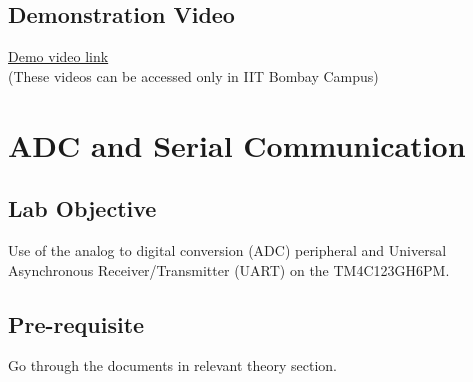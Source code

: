 \documentclass[a4paper,12pt,oneside]{book}
\begin{document}
\section{Demonstration Video}
\href{: http://10.129.139.139/videos/Lab3.html}{Demo video link}\\
(These videos can be accessed only in IIT Bombay Campus)



\chapter{ADC and Serial Communication}
\section{Lab Objective}
Use of the analog to digital conversion (ADC) peripheral and Universal Asynchronous Receiver/Transmitter (UART) on the TM4C123GH6PM.


\section{Pre-requisite}
Go through the documents in relevant theory section.


\end{document}
